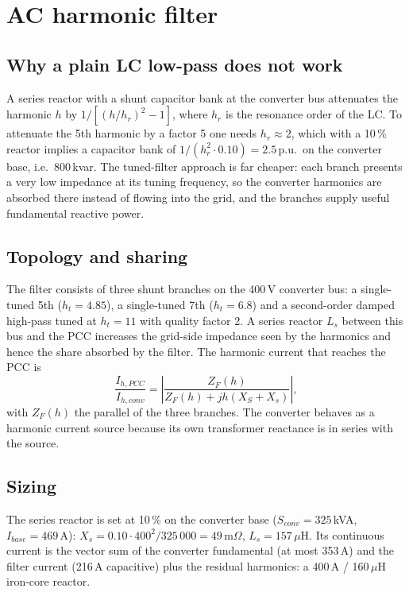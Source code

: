 \documentclass[11pt,a4paper]{article}
\begin{document}
\section{AC harmonic filter}
\label{sec:acfilter}

\subsection{Why a plain LC low-pass does not work}

A series reactor with a shunt capacitor bank at the converter bus attenuates the harmonic $h$ by $1/[(h/h_r)^2 - 1]$, where $h_r$ is the resonance order of the LC. To attenuate the 5th harmonic by a factor 5 one needs $h_r \approx 2$, which with a 10\,\% reactor implies a capacitor bank of $1/(h_r^2\cdot0.10) = 2.5$\,p.u.\ on the converter base, i.e.\ 800\,kvar. The tuned-filter approach is far cheaper: each branch presents a very low impedance at its tuning frequency, so the converter harmonics are absorbed there instead of flowing into the grid, and the branches supply useful fundamental reactive power.

\subsection{Topology and sharing}

The filter consists of three shunt branches on the 400\,V converter bus: a single-tuned 5th ($h_t = 4.85$), a single-tuned 7th ($h_t = 6.8$) and a second-order damped high-pass tuned at $h_t = 11$ with quality factor 2. A series reactor $L_s$ between this bus and the PCC increases the grid-side impedance seen by the harmonics and hence the share absorbed by the filter. The harmonic current that reaches the PCC is
\begin{equation}
\frac{I_{h,PCC}}{I_{h,conv}} = \left|\frac{Z_F(h)}{Z_F(h) + jh(X_S + X_s)}\right|,
\label{eq:share}
\end{equation}
with $Z_F(h)$ the parallel of the three branches. The converter behaves as a harmonic current source because its own transformer reactance is in series with the source.

\subsection{Sizing}

The series reactor is set at 10\,\% on the converter base ($S_{conv} = 325$\,kVA, $I_{base} = 469$\,A): $X_s = 0.10\cdot400^2/325\,000 = 49$\,m$\Omega$, $L_s = 157$\,$\mu$H. Its continuous current is the vector sum of the converter fundamental (at most 353\,A) and the filter current (216\,A capacitive) plus the residual harmonics: a 400\,A / 160\,$\mu$H iron-core reactor.
\end{document}
